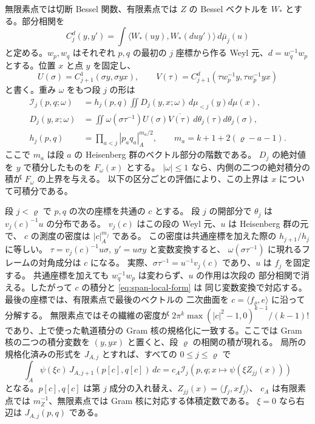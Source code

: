 無限素点では切断 Bessel 関数、有限素点では \(Z\) の Bessel ベクトルを
\(W_\ast\) とする。部分相関を
\[
 C_j^d(y,y')=\int
  \langle W_\ast(u y),W_\ast(d u y')\rangle\,d\bar\mu_j(u)
\]
と定める。\(w_p,w_q\) はそれぞれ \(p,q\) の最初の \(j\) 座標から作る
Weyl 元、\(d=w_q^{-1}w_p\) とする。位置 \(x\) と点 \(y\) を固定し、
\[
 U(\sigma)=C_{j+1}^1(\sigma y,\sigma yx),\qquad
 V(\tau)=C_{j+1}^{d}(\tau w_p^{-1}y,\tau w_p^{-1}yx)
\]
と書く。重み \(\omega\) をもつ段 \(j\) の形は
\begin{equation}\label{eq:span-local-form}
 \begin{split}
 \mathcal I_j(p,q;\omega)
 &=h_j(p,q)\iint
       D_j(y,x;\omega)\,d\mu_{<j}(y)d\mu(x),\\
 D_j(y,x;\omega)
 &=\iint \omega(\sigma\tau^{-1})U(\sigma)\overline{V(\tau)}
                           \,d\theta_j(\tau)d\theta_j(\sigma),\\
 h_j(p,q)&=\prod_{a<j}|p_a q_a|_A^{m_a/2},\qquad
 m_a=k+1+2(\varrho-a-1).
 \end{split}
\end{equation}
ここで \(m_a\) は段 \(a\) の Heisenberg 群のベクトル部分の階数である。
\(D_j\) の絶対値を \(y\) で積分したものを \(F_\omega(x)\) とする。
\(|\omega|\le1\) なら、内側の二つの絶対積分の積が \(F_\omega\) の上界を与える。
以下の区分ごとの評価により、この上界は \(x\) について可積分である。

段 \(j<\varrho\) で \(p,q\) の次の座標を共通の \(c\) とする。
段 \(j\) の開部分で \(\theta_j\) は \(v_j(c)^{-1}u\) の分布である。
\(v_j(c)\) はこの段の Weyl 元、\(u\) は Heisenberg 群の元で、
\(c\) の測度の密度は \(|c|_A^{m_j}\) である。
この密度は共通座標を加えた際の \(h_{j+1}/h_j\) に等しい。
\(\tau=v_j(c)^{-1}u\sigma,\ y'=u\sigma y\) と変数変換すると、
\(\omega(\sigma\tau^{-1})\) に現れるフレームの対角成分は \(c\) になる。
実際、\(\sigma\tau^{-1}=u^{-1}v_j(c)\) であり、\(u\) は \(f_j\) を固定する。
共通座標を加えても \(w_q^{-1}w_p\) は変わらず、\(u\) の作用は次段の
部分相関で消える。したがって \(c\) の積分と \eqref{eq:span-local-form} は
同じ変数変換で対応する。最後の座標では、有限素点で最後のベクトルの
二次曲面を \(c=\langle f_\varrho,e\rangle\) に沿って分解する。
無限素点ではその繊維の密度が
\(2\pi^k\max(|c|^2-1,0)^{k-1}/(k-1)!\) であり、上で使った軌道積分の
Gram 核の規格化に一致する。ここでは Gram 核の二つの積分変数を
\((y,yx)\) と置くと、段 \(\varrho\) の相関の積が現れる。
局所の規格化済みの形式を \(J_{A,j}\) とすれば、すべての \(0\le j\le\varrho\) で
\begin{equation}\label{eq:span-local-descent}
 \int_A\psi(\xi c)\,J_{A,j+1}(p[c],q[c])\,dc
   =c_A\mathcal I_j(p,q;x\mapsto\psi(\xi Z_{jj}(x)))
\end{equation}
となる。\(p[c],q[c]\) は第 \(j\) 成分の入れ替え、\(Z_{jj}(x)=\langle f_j,xf_j\rangle\)、
\(c_A\) は有限素点では \(m_Z^{-1}\)、無限素点では Gram 核に対応する体積定数である。
\(\xi=0\) なら右辺は \(J_{A,j}(p,q)\) である。

